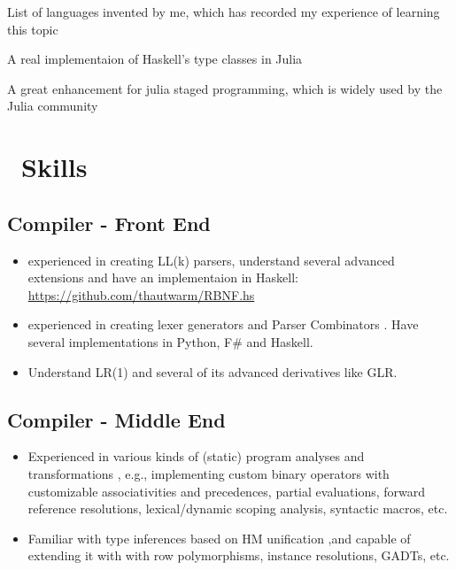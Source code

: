 \documentclass{resume}
\begin{document}
List of languages invented by me, which has recorded my experience of learning this topic

A real implementaion of Haskell's type classes in Julia

A great enhancement for julia staged programming, which is widely used by the Julia community

\section{\faCogs\ Skills}

\subsection{\textbf{Compiler - Front End}}
\begin{itemize}
  \item experienced in creating LL(k) parsers, understand several advanced extensions and have an implementaion
        in Haskell: \url{https://github.com/thautwarm/RBNF.hs}
  \item experienced in creating lexer generators and Parser Combinators
        . Have several implementations in Python, F\# and Haskell.
  \item Understand LR(1) and several of its advanced derivatives like GLR.
\end{itemize}

\subsection{\textbf{Compiler - Middle End}}
\begin{itemize}
  \item Experienced in various kinds of (static) program analyses and transformations
        , e.g.,
          implementing custom binary operators with customizable associativities and precedences,
          partial evaluations, forward reference resolutions, lexical/dynamic scoping analysis, syntactic macros, etc.
  \item Familiar with type inferences based on HM unification
      ,and capable of extending it with
       with row polymorphisms, instance resolutions, GADTs, etc.
\end{itemize}
\end{document}
